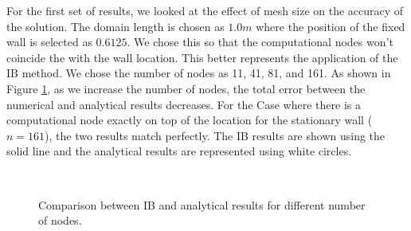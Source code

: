 For the first set of results, we looked at the effect of mesh size on the accuracy of the solution. The domain length is chosen as $1.0 m$ where the position of the fixed wall is selected as $0.6125$. We chose this so that the computational nodes won't coincide the with the wall location. This better represents the application of the IB method. We chose the number of nodes as 11, 41, 81, and 161. As shown in Figure \ref{fig:C3_penalizationResultNodeNumber}, as we increase the number of nodes, the total error between the numerical and analytical results decreases. For the Case where there is a computational node exactly on top of the location for the stationary wall ($n=161$), the two results match perfectly. The IB results are shown using the solid line and the analytical results are represented using white circles.

\begin{figure}[H]
    \centering
    \quad
    \\
    \quad
    \caption{Comparison between IB and analytical results for different number of nodes.}
    \label{fig:C3_penalizationResultNodeNumber}
\end{figure}

